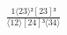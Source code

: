 \documentclass[varwidth, border=5pt]{standalone}
\begin{document}
\begin{my}
$\begin{gathered}
\scriptscriptstyle\frac{1⟨23⟩²[23]³}{⟨12⟩[24]³⟨34⟩}
\end{gathered}$
\end{my}
\end{document}
